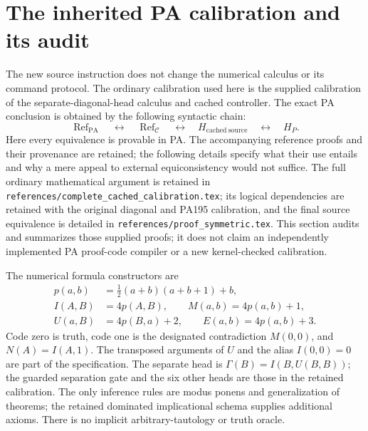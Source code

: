 \section{The inherited PA calibration and its audit}
\label{sec:calibration-audit}

The new source instruction does not change the numerical calculus or its
command protocol. The ordinary calibration used here is the supplied
calibration of the separate-diagonal-head calculus and cached controller.
The exact PA conclusion is obtained by the following syntactic chain:
\[
 \operatorname{Ref}_{\mathrm{PA}}\quad\longleftrightarrow\quad
 \operatorname{Ref}_{\mathcal C}\quad\longleftrightarrow\quad
 H_{\mathrm{cached\ source}}\quad\longleftrightarrow\quad H_P.
                                                        \tag{F3}
\]
Here every equivalence is provable in PA. The accompanying reference
proofs and their provenance are retained; the following details specify
what their use entails and why a mere appeal to external equiconsistency
would not suffice.
The full ordinary mathematical argument is retained in
\texttt{references/complete\_cached\_calibration.tex}; its logical
dependencies are retained with the original diagonal and PA195
calibration, and the final source equivalence is detailed in
\texttt{references/proof\_symmetric.tex}. This section audits and
summarizes those supplied proofs; it does not claim an independently
implemented PA proof-code compiler or a new kernel-checked calibration.

The numerical formula constructors are
\[
\begin{split}
 p(a,b)&=\tfrac12(a+b)(a+b+1)+b,\\
 I(A,B)&=4p(A,B),\qquad M(a,b)=4p(a,b)+1,\\
 U(a,B)&=4p(B,a)+2,\qquad E(a,b)=4p(a,b)+3.
\end{split}
\]
Code zero is truth, code one is the designated contradiction $M(0,0)$,
and $N(A)=I(A,1)$. The transposed arguments of $U$ and the alias
$I(0,0)=0$ are part of the specification. The separate head is
$\Gamma(B)=I(B,U(B,B))$; the guarded separation gate and the six other
heads are those in the retained calibration. The only inference rules
are modus ponens and generalization of theorems; the retained dominated
implicational schema supplies additional axioms. There is no implicit
arbitrary-tautology or truth oracle.


